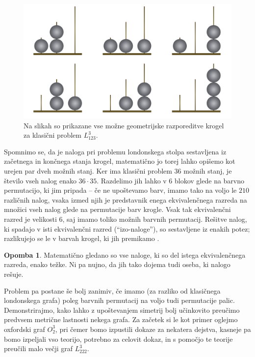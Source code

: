 \documentclass[12pt,a4paper]{amsart}
\theoremstyle{definition} %
\newtheorem{opomba}[definicija]{Opomba}
\theoremstyle{plain} %
\begin{document}
\begin{figure}
    \includegraphics[width=400pt]{img/london-tower-nocolor-all.png}
    \caption{Na slikah so prikazane vse možne geometrijske razporeditve krogel za klasični problem $L_{123}^3$.}
\end{figure}

Spomnimo se, da je naloga pri problemu londonskega stolpa sestavljena iz začetnega in končnega stanja krogel, matematično jo torej lahko opišemo kot urejen par dveh možnih stanj. Ker ima klasični problem 36 možnih stanj, je število vseh nalog enako $36 \cdot 35$. Razdelimo jih lahko v $6$ blokov glede na barvno permutacijo, ki jim pripada -- če ne upoštevamo barv, imamo tako na voljo le $210$ različnih nalog, vsaka izmed njih je predstavnik enega ekvivalenčnega razreda na množici vseh nalog glede na permutacije barv krogle. Vsak tak ekvivalenčni razred je velikosti $6$, saj imamo toliko možnih barvnih permutacij. Rešitve nalog, ki spadajo v isti ekvivalenčni razred (``izo-naloge''), so sestavljene iz enakih potez;  razlikujejo se le v barvah krogel, ki jih premikamo \cite[str.\ 591]{bib:tolspatial}.

\begin{opomba}
    Matematično gledano so vse naloge, ki so del istega ekvivalenčnega razreda, enako težke. Ni pa nujno, da jih tako dojema tudi oseba, ki nalogo rešuje.
\end{opomba}

Problem pa postane še bolj zanimiv, če imamo (za razliko od klasičnega londonskega grafa) poleg barvnih permutacij na voljo tudi permutacije palic. Demonstrirajmo, kako lahko z upoštevanjem simetrij bolj učinkovito preučimo predvsem metrične lastnosti nekega grafa. Za začetek si le kot primer oglejmo oxfordski graf $O_2^3$, pri čemer bomo izpustili dokaze za nekatera dejstva, kasneje pa bomo izpeljali vso teorijo, potrebno za celovit dokaz, in s pomočjo te teorije preučili malo večji graf $L^3_{222}$. 
\end{document}
